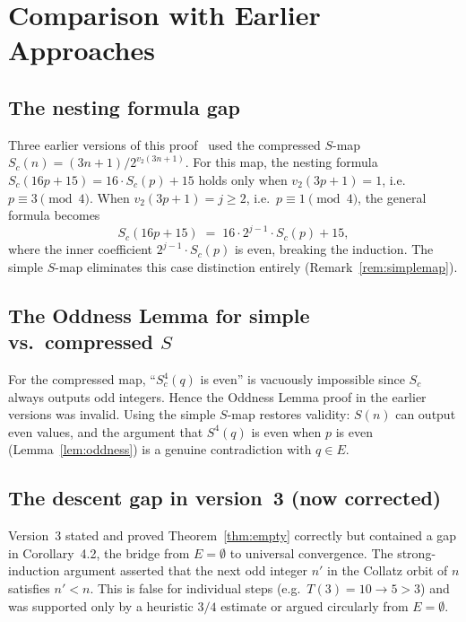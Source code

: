 \documentclass{amsart}
\theoremstyle{definition}
\theoremstyle{remark}
\newcommand{\vv}[1]{v_2\!\left(#1\right)}   %
\newcommand{\Sc}{S_c}                         %
\begin{document}
\section{Comparison with Earlier Approaches}
\label{sec:comparison}

\subsection{The nesting formula gap}

Three earlier versions of this proof~\cite{Wakil2025a,Wakil2025b,Wakil2025c}
used the compressed $S$-map $\Sc(n)=(3n+1)/2^{\vv{3n+1}}$.
For this map, the nesting formula $\Sc(16p+15)=16\cdot\Sc(p)+15$ holds only
when $\vv{3p+1}=1$, i.e.\ $p\equiv 3\pmod{4}$.
When $\vv{3p+1}=j\ge 2$, i.e.\ $p\equiv 1\pmod{4}$, the general formula
becomes
\[
  \Sc(16p+15) \;=\; 16\cdot 2^{j-1}\cdot\Sc(p)+15,
\]
where the inner coefficient $2^{j-1}\cdot\Sc(p)$ is even, breaking the
induction.
The simple $S$-map eliminates this case distinction entirely
(Remark~\ref{rem:simplemap}).

\subsection{The Oddness Lemma for simple vs.\ compressed $S$}

For the compressed map, ``$S_c^4(q)$ is even'' is vacuously impossible
since $\Sc$ always outputs odd integers.
Hence the Oddness Lemma proof in the earlier versions was invalid.
Using the simple $S$-map restores validity: $S(n)$ can output even values,
and the argument that $S^4(q)$ is even when $p$ is even
(Lemma~\ref{lem:oddness}) is a genuine contradiction with $q\in E$.

\subsection{The descent gap in version~3 (now corrected)}

Version~3 stated and proved Theorem~\ref{thm:empty} correctly but contained
a gap in Corollary~4.2, the bridge from $E=\emptyset$ to universal
convergence.
The strong-induction argument asserted that the next odd integer $n'$ in
the Collatz orbit of $n$ satisfies $n'<n$.
This is false for individual steps (e.g.\ $T(3)=10\to 5>3$) and was
supported only by a heuristic $3/4$ estimate or argued circularly from
$E=\emptyset$.
\end{document}
